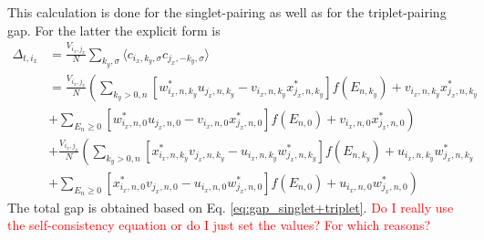 This calculation is done for the singlet-pairing as well as for the triplet-pairing gap.
For the latter the explicit form is
\begin{align} \nonumber
    \Delta_{t,i_x} &= \frac{V_{i_x, j_x}}{N} \sum_{k_y, \sigma} \langle c_{i_x, k_y, \sigma}c_{j_x, -k_y, \sigma}\rangle\\ \nonumber
    &= \frac{V_{i_x, j_x}}{N} \left( \sum_{k_y >0,n} \left[ w^*_{i_x,n,k_y}u_{j_x,n,k_y}-v_{i_x,n,k_y}x^*_{j_x,n,k_y}\right]f(E_{n,k_y}) +v_{i_x,n,k_y}x^*_{j_x,n,k_y} \right. \\ \nonumber
    &+ \left.\sum_{E_n \geq0} \left[ w^*_{i_x,n,0}u_{j_x,n,0}-v_{i_x,n,0}x^*_{j_x,n,0}\right]f(E_{n,0})+ v_{i_x,n,0}x^*_{j_x,n,0} \right) \\ \nonumber
    &+ \frac{V_{i_x, j_x}}{N} \left( \sum_{k_y >0,n} \left[ x^*_{i_x,n,k_y}v_{j_x,n,k_y}-u_{i_x,n,k_y}w^*_{j_x,n,k_y}\right]f(E_{n,k_y}) +u_{i_x,n,k_y}w^*_{j_x,n,k_y} \right. \\
    &+ \left.\sum_{E_n \geq0} \left[ x^*_{i_x,n,0}v_{j_x,n,0}-u_{i_x,n,0}w^*_{j_x,n,0}\right]f(E_{n,0})+ u_{i_x,n,0}w^*_{j_x,n,0} \right) 
    \label{eq:gap_triplet_num}
\end{align}
The total gap is obtained based on Eq. \ref{eq:gap_singlet+triplet}. \newline
\textcolor{red}{Do I really use the self-consistency equation or do I just set the values? For which reasons?}

